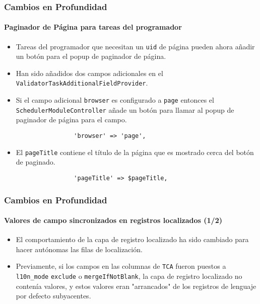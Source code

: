 \begin{frame}[fragile]
	\frametitle{Cambios en Profundidad}
	\framesubtitle{Paginador de Página para tareas del programador}

	\begin{itemize}
		\item Tareas del programador que necesitan un \texttt{uid} de página pueden ahora añadir un botón para el popup de paginador de página.

		\item Han sido añadidos dos campos adicionales en el \texttt{ValidatorTaskAdditionalFieldProvider}.

		\item Si el campo adicional \texttt{browser} es configurado a \texttt{page} entonces el
			\texttt{SchedulerModuleController} añade un botón para llamar al popup de paginador de página para el campo.

			\begin{lstlisting}
				'browser' => 'page',
			\end{lstlisting}

		\item El \texttt{pageTitle} contiene el título de la página que es mostrado cerca del botón de paginado.

			\begin{lstlisting}
				'pageTitle' => $pageTitle,
			\end{lstlisting}

	\end{itemize}

\end{frame}


\begin{frame}[fragile]
	\frametitle{Cambios en Profundidad}
	\framesubtitle{Valores de campo sincronizados en registros localizados (1/2)}

	\lstset{basicstyle=\tiny\ttfamily}

	\begin{itemize}
		\item El comportamiento de la capa de registro localizado ha sido cambiado para hacer autónomas las filas de localización.

		\item Previamente, si los campos en las columnas de \texttt{TCA} fueron puestos a \texttt{l10n\_mode} \texttt{exclude} o
			\texttt{mergeIfNotBlank}, la capa de registro localizado no contenía valores, y estos valores eran
			"arrancados" de los registros de lenguaje por defecto subyacentes.

	\end{itemize}

\end{frame}

